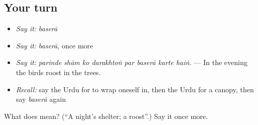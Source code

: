 \subsection*{Your turn}
\begin{itemize}
\raggedright
  \item \emph{Say it:} \emph{baserā}
  \item \emph{Say it:} \emph{baserā}, once more
  \item \emph{Say it:} \emph{parinde shām ko darakhtoṅ par baserā karte haiṅ.} — In the evening the birds roost in the trees.
  \item \emph{Recall:} say the Urdu for to wrap oneself in, then the Urdu for a canopy, then say \emph{baserā} again
\end{itemize}

\begin{tcolorbox}[breakable,colback=teal!4,colframe=teal!35!black,title={Before you move on}]
What does  mean? (\textquotedblleft{}A night's shelter; a roost\textquotedblright{}.) Say it once more.
\end{tcolorbox}
